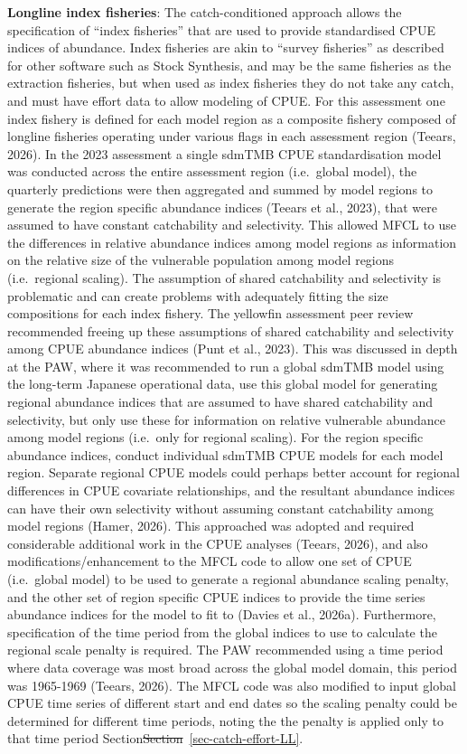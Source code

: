 \documentclass[
  english,
  a4paper,
  a4paper,
  11pt]{SCreport}
\providecommand{\DIFdel}[1]{{\protect\color{red}\sout{#1}}}                      %
\providecommand{\DIFdelbegin}{} %
\providecommand{\DIFdelend}{} %
\newcommand{\DIFscaledelfig}{0.5}
\newlength{\DIFdelgraphicswidth} %
\newlength{\DIFdelgraphicsheight} %
\newcommand{\DIFdelincludegraphics}[2][]{%
\sbox{\DIFdelgraphicsbox}{\DIFOincludegraphics[#1]{#2}}%
\settoboxwidth{\DIFdelgraphicswidth}{\DIFdelgraphicsbox} %
\settoboxtotalheight{\DIFdelgraphicsheight}{\DIFdelgraphicsbox} %
\scalebox{\DIFscaledelfig}{%
\parbox[b]{\DIFdelgraphicswidth}{\usebox{\DIFdelgraphicsbox}\\[-\baselineskip] \rule{\DIFdelgraphicswidth}{0em}}\llap{\resizebox{\DIFdelgraphicswidth}{\DIFdelgraphicsheight}{%
\setlength{\unitlength}{\DIFdelgraphicswidth}%
\begin{picture}(1,1)%
\thicklines\linethickness{2pt} %
{\color[rgb]{1,0,0}\put(0,0){\framebox(1,1){}}}%
{\color[rgb]{1,0,0}\put(0,0){\line( 1,1){1}}}%
{\color[rgb]{1,0,0}\put(0,1){\line(1,-1){1}}}%
\end{picture}%
}\hspace*{3pt}}} %
} %
\DeclareRobustCommand{\DIFdelbegin}{\DIFOdelbegin \let\includegraphics\DIFdelincludegraphics} %
\DeclareRobustCommand{\DIFdelend}{\DIFOaddend \let\includegraphics\DIFOincludegraphics} %
\begin{document}
\textbf{Longline index fisheries}: The catch-conditioned approach allows
the specification of ``index fisheries'' that are used to provide
standardised CPUE indices of abundance. Index fisheries are akin to
``survey fisheries'' as described for other software such as Stock
Synthesis, and may be the same fisheries as the extraction fisheries,
but when used as index fisheries they do not take any catch, and must
have effort data to allow modeling of CPUE. For this assessment one
index fishery is defined for each model region as a composite fishery
composed of longline fisheries operating under various flags in each
assessment region (Teears, 2026). In the 2023 assessment a single sdmTMB
CPUE standardisation model was conducted across the entire assessment
region (i.e.~global model), the quarterly predictions were then
aggregated and summed by model regions to generate the region specific
abundance indices (Teears et al., 2023), that were assumed to have
constant catchability and selectivity. This allowed MFCL to use the
differences in relative abundance indices among model regions as
information on the relative size of the vulnerable population among
model regions (i.e.~regional scaling). The assumption of shared
catchability and selectivity is problematic and can create problems with
adequately fitting the size compositions for each index fishery. The
yellowfin assessment peer review recommended freeing up these
assumptions of shared catchability and selectivity among CPUE abundance
indices (Punt et al., 2023). This was discussed in depth at the PAW,
where it was recommended to run a global sdmTMB model using the
long-term Japanese operational data, use this global model for
generating regional abundance indices that are assumed to have shared
catchability and selectivity, but only use these for information on
relative vulnerable abundance among model regions (i.e.~only for
regional scaling). For the region specific abundance indices, conduct
individual sdmTMB CPUE models for each model region. Separate regional
CPUE models could perhaps better account for regional differences in
CPUE covariate relationships, and the resultant abundance indices can
have their own selectivity without assuming constant catchability among
model regions (Hamer, 2026). This approached was adopted and required
considerable additional work in the CPUE analyses (Teears, 2026), and
also modifications/enhancement to the MFCL code to allow one set of CPUE
(i.e.~global model) to be used to generate a regional abundance scaling
penalty, and the other set of region specific CPUE indices to provide
the time series abundance indices for the model to fit to (Davies et
al., 2026a). Furthermore, specification of the time period from the
global indices to use to calculate the regional scale penalty is
required. The PAW recommended using a time period where data coverage
was most broad across the global model domain, this period was 1965-1969
(Teears, 2026). The MFCL code was also modified to input global CPUE
time series of different start and end dates so the scaling penalty
could be determined for different time periods, noting the the penalty
is applied only to that time period Section\DIFdelbegin \DIFdel{Section}\DIFdelend ~\ref{sec-catch-effort-LL}.
\end{document}
